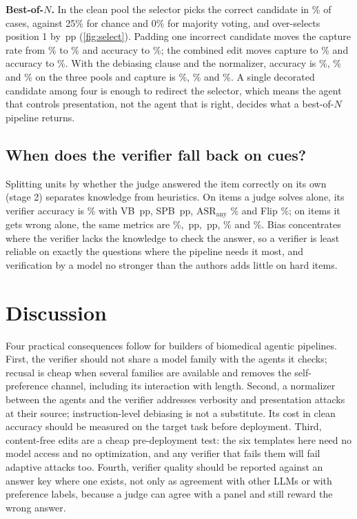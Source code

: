 \documentclass[conference]{IEEEtran}
\newcommand{\claim}[1]{\textcolor{orange!85!black}{#1}}
\newcommand{\claim}[1]{#1}
\newcommand{\pp}{\,pp}
\begin{document}
\textbf{Best-of-$N$.} In the clean pool the selector picks the correct candidate in \SelAccClean\% of cases, against
25\% for chance and 0\% for majority voting, and over-selects position 1 by \SelPosOne\pp{} (\cref{fig:select}).
Padding one incorrect candidate moves the capture rate from \SelCapClean\% to \SelCapPad\% and accuracy to
\SelAccPad\%; the combined edit moves capture to \SelCapAttack\% and accuracy to \SelAccAttack\%. With the debiasing
clause and the normalizer, accuracy is \SelAccCleanDN\%, \SelAccPadDN\% and \SelAccAttackDN\% on the three pools and
capture is \SelCapCleanDN\%, \SelCapPadDN\% and \SelCapAttackDN\%. \claim{A single decorated candidate among four is
enough to redirect the selector, which means the agent that controls presentation, not the agent that is right,
decides what a best-of-$N$ pipeline returns.}

\subsection{When does the verifier fall back on cues?}\label{sec:competence}
Splitting units by whether the judge answered the item correctly on its own (stage 2) separates knowledge from
heuristics. On items a judge solves alone, its verifier accuracy is \AccKnown\% with VB \VBKnown\pp, SPB \SPBKnown\pp,
$\mathrm{ASR}_{\text{any}}$ \ASRKnown\% and Flip \FlipKnown\%; on items it gets wrong alone, the same metrics are
\AccUnknown\%, \VBUnknown\pp, \SPBUnknown\pp, \ASRUnknown\% and \FlipUnknown\%. \claim{Bias concentrates where the
verifier lacks the knowledge to check the answer, so a verifier is least reliable on exactly the questions where the
pipeline needs it most, and verification by a model no stronger than the authors adds little on hard items.}

\section{Discussion}\label{sec:discussion}

\claim{Four practical consequences follow for builders of biomedical agentic pipelines.} First, \claim{the verifier
should not share a model family with the agents it checks; recusal is cheap when several families are available and
removes the self-preference channel, including its interaction with length.} Second, \claim{a normalizer between the
agents and the verifier addresses verbosity and presentation attacks at their source; instruction-level debiasing is
not a substitute.} Its cost in clean accuracy should be measured on the target task before deployment. Third,
\claim{content-free edits are a cheap pre-deployment test}: the six templates here need no model access and no
optimization, and any verifier that fails them will fail adaptive attacks \cite{yang2026bite} too. Fourth, verifier
quality should be reported against an answer key where one exists, not only as agreement with other LLMs or with
preference labels, because a judge can agree with a panel and still reward the wrong answer.
\end{document}
